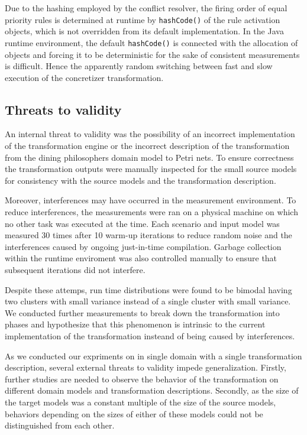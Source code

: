 Due to the hashing employed by the conflict resolver, the firing order of equal priority rules is determined at runtime by \texttt{hashCode()} of the rule activation objects, which is not overridden from its default implementation. In the Java runtime environment, the default \texttt{hashCode()} is connected with the allocation of objects and forcing it to be deterministic for the sake of consistent measurements is difficult. Hence the apparently random switching between fast and slow execution of the concretizer transformation.

\subsection{Threats to validity}

An internal threat to validity was the possibility of an incorrect implementation of the transformation engine or the incorrect description of the transformation from the dining philosophers domain model to Petri nets. To ensure correctness the transformation outputs were manually inspected for the small source models for consistency with the source models and the transformation description.

Moreover, interferences may have occurred in the measurement environment. To reduce interferences, the measurements were ran on a physical machine on which no other task was executed at the time. Each scenario and input model was measured 30 times after 10 warm-up iterations to reduce random noise and the interferences caused by ongoing just-in-time compilation. Garbage collection within the runtime enviroment was also controlled manually to ensure that subsequent iterations did not interfere.

Despite these attemps, run time distributions were found to be bimodal having two clusters with small variance instead of a single cluster with small variance. We conducted further measurements to break down the transformation into phases and hypothesize that this phenomenon is intrinsic to the current implementation of the transformation insteand of being caused by interferences.

As we conducted our expriments on in single domain with a single transformation description, several external threats to validity impede generalization. Firstly, further studies are needed to observe the behavior of the transformation on different domain models and transformation descriptions. Secondly, as the size of the target  models was a constant multiple of the size of the source models, behaviors depending on the sizes of either of these models could not be distinguished from each other.
